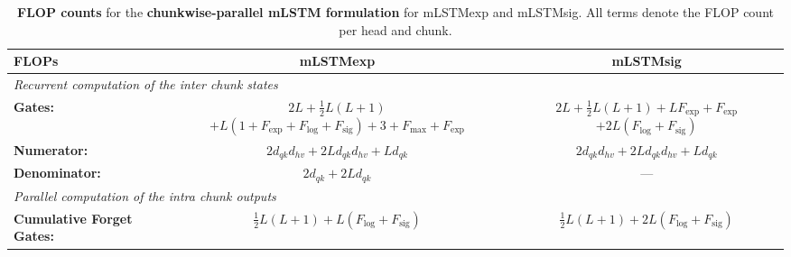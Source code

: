\documentclass{article}
\begin{document}
    \begin{table}[htbp]
        \vspace{-0.3cm}
        \centering
        \caption{\label{tab:flop_counts_mlstm_chunkwise} \textbf{FLOP counts} for the \textbf{chunkwise-parallel mLSTM formulation} for mLSTMexp and mLSTMsig.
            All terms denote the FLOP count per head and chunk.}
        \vspace{0.2cm}
        \begin{adjustbox}{width=\textwidth}
            \begin{tabular}{lcc}
                \toprule
                FLOPs                             & mLSTMexp                                                                                         & mLSTMsig                                                            \\
                \midrule
                \multicolumn{3}{l}{\textit{Recurrent computation of the inter chunk states}}                                                                                                                               \\
                \textbf{Gates:}                   & \thead{$2L + \frac{1}{2} L (L + 1)$                                                                                                                                    \\ $ + L(1+F_\text{exp}+F_\text{log}+F_\text{sig}) + 3 + F_\text{max} + F_\text{exp} $} & \thead{$2L + \frac{1}{2} L (L + 1) + L F_\text{exp} + F_\text{exp}$ \\ $+ 2L (F_\text{log} + F_\text{sig}) $} \\
                \textbf{Numerator:}               & $2d_{qk} d_{hv} + 2L d_{qk} d_{hv} + L d_{qk}$                                                   & $2d_{qk} d_{hv} + 2L d_{qk} d_{hv} + L d_{qk}$                      \\
                \textbf{Denominator:}             & $2d_{qk} + 2L d_{qk}$                                                                            & ---                                                                 \\
                \midrule
                \multicolumn{3}{l}{\textit{Parallel computation of the intra chunk outputs}}                                                                                                                               \\
                \textbf{Cumulative Forget Gates:} & $\frac{1}{2} L (L + 1) + L (F_\text{log} + F_\text{sig})$                                        & $\frac{1}{2} L (L + 1) + 2L (F_\text{log} + F_\text{sig})$          \\

\end{tabular}
\end{adjustbox}
\end{table}
\end{document}
